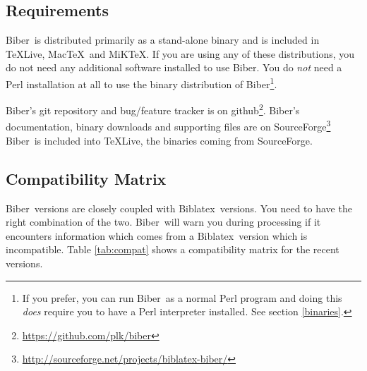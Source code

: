 \documentclass{ltxdockit}
\newcommand*{\biber}{Biber\xspace}
\newcommand*{\biblatex}{Biblatex\xspace}
\begin{document}
\subsection{Requirements}\label{ref:req}

\biber\ is distributed primarily as a stand-alone binary and is
included in \TeX Live, Mac\TeX\ and MiK\TeX. If you are using any of these
distributions, you do not need any additional software installed to use
\biber. You do \emph{not} need a Perl installation at all to use
the binary distribution of \biber\footnote{If you prefer, you can run
\biber\ as a normal Perl program and doing this \emph{does} require
you to have a Perl interpreter installed. See section \ref{binaries}.}.

\biber's git repository and bug/feature tracker is on
github\footnote{\url{https://github.com/plk/biber}}. \biber's documentation,
binary downloads and supporting files are on
SourceForge\footnote{\url{http://sourceforge.net/projects/biblatex-biber/}}
\biber\ is included into \TeX Live, the binaries coming from SourceForge.

\subsection{Compatibility Matrix}

\biber\ versions are closely coupled with \biblatex\ versions. You
need to have the right combination of the two. \biber\ will warn you
during processing if it encounters information which comes from a
\biblatex\ version which is incompatible. Table \ref{tab:compat} shows a
compatibility matrix for the recent versions.
\end{document}
